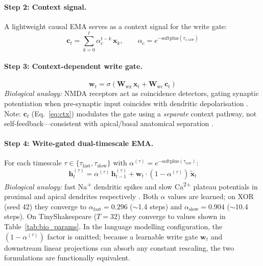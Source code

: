 \documentclass[11pt,a4paper]{article}
\begin{document}
\paragraph{Step 2: Context signal.}
A lightweight causal EMA serves as a context signal for the write gate:
\begin{equation}
  \mathbf{c}_t = \sum_{k=0}^{t}\alpha_c^{t-k}\,\mathbf{x}_k,
  \qquad \alpha_c = e^{-\mathrm{softplus}(\tau_{c,\mathrm{raw}})}
  \label{eq:ctx}
\end{equation}

\paragraph{Step 3: Context-dependent write gate.}
\begin{equation}
  \mathbf{w}_t = \sigma(\mathbf{W}_{\mathrm{wx}}\,\mathbf{x}_t
                       + \mathbf{W}_{\mathrm{wc}}\,\mathbf{c}_t)
  \label{eq:writegate}
\end{equation}
\emph{Biological analogy:} NMDA receptors act as coincidence detectors,
gating synaptic potentiation when pre-synaptic input coincides with
dendritic depolarisation \citep{malenka1993nmda}.
Note: $\mathbf{c}_t$ (Eq.~\ref{eq:ctx}) modulates the gate using a
\emph{separate} context pathway, not self-feedback---consistent with
apical/basal anatomical separation \citep{larkum2013cellular}.

\paragraph{Step 4: Write-gated dual-timescale EMA.}
For each timescale $\tau \in \{\tau_\mathrm{fast}, \tau_\mathrm{slow}\}$
with $\alpha^{(\tau)} = e^{-\mathrm{softplus}(\tau_\mathrm{raw})}$:
\begin{equation}
  \mathbf{h}_t^{(\tau)} = \alpha^{(\tau)}\,\mathbf{h}_{t-1}^{(\tau)}
    + \mathbf{w}_t \cdot (1-\alpha^{(\tau)})\,\tilde{\mathbf{x}}_t
  \label{eq:ema}
\end{equation}
\emph{Biological analogy:} fast Na\textsuperscript{+} dendritic spikes
and slow Ca\textsuperscript{2+} plateau potentials in proximal and
apical dendrites respectively \citep{losonczy2006integrative,
francioni2026vectorized}. Both $\alpha$ values are learned; on XOR
(seed 42) they converge to $\alpha_\mathrm{fast}=0.296$ ($\sim$1.4 steps)
and $\alpha_\mathrm{slow}=0.904$ ($\sim$10.4 steps). On TinyShakespeare
($T=32$) they converge to values shown in Table~\ref{tab:bio_params}.
In the language modelling configuration, the $(1-\alpha^{(\tau)})$ factor
is omitted; because a learnable write gate $\mathbf{w}_t$ and downstream
linear projections can absorb any constant rescaling, the two formulations
are functionally equivalent.
\end{document}
